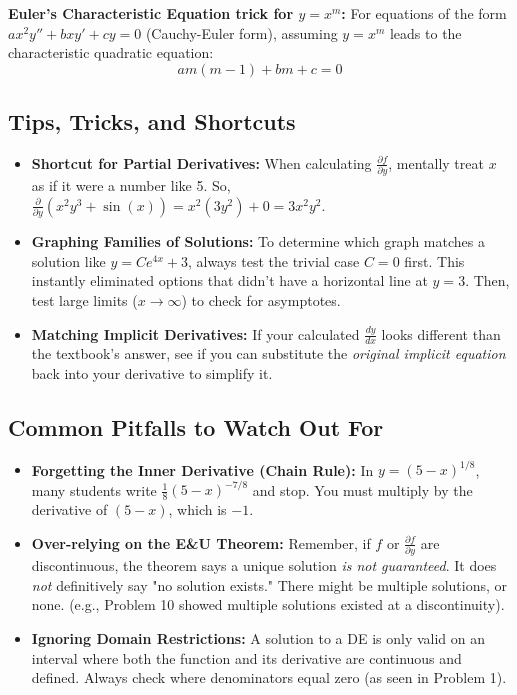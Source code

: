 \documentclass[12pt]{article}
\begin{document}
\textbf{Euler's Characteristic Equation trick for $y = x^m$:}
For equations of the form $ax^2y'' + bxy' + cy = 0$ (Cauchy-Euler form), assuming $y=x^m$ leads to the characteristic quadratic equation: 
\[ am(m-1) + bm + c = 0 \]

\subsection*{Tips, Tricks, and Shortcuts}
\begin{itemize}
    \item \textbf{Shortcut for Partial Derivatives:} When calculating $\frac{\partial f}{\partial y}$, mentally treat $x$ as if it were a number like 5. So, $\frac{\partial}{\partial y}(x^2 y^3 + \sin(x)) = x^2(3y^2) + 0 = 3x^2y^2$.
    \item \textbf{Graphing Families of Solutions:} To determine which graph matches a solution like $y = Ce^{4x} + 3$, always test the trivial case $C=0$ first. This instantly eliminated options that didn't have a horizontal line at $y=3$. Then, test large limits ($x \to \infty$) to check for asymptotes.
    \item \textbf{Matching Implicit Derivatives:} If your calculated $\frac{dy}{dx}$ looks different than the textbook's answer, see if you can substitute the \textit{original implicit equation} back into your derivative to simplify it.
\end{itemize}

\subsection*{Common Pitfalls to Watch Out For}
\begin{itemize}
    \item \textbf{Forgetting the Inner Derivative (Chain Rule):} In $y=(5-x)^{1/8}$, many students write $\frac{1}{8}(5-x)^{-7/8}$ and stop. You must multiply by the derivative of $(5-x)$, which is $-1$.
    \item \textbf{Over-relying on the E\&U Theorem:} Remember, if $f$ or $\frac{\partial f}{\partial y}$ are discontinuous, the theorem says a unique solution \textit{is not guaranteed}. It does \textit{not} definitively say "no solution exists." There might be multiple solutions, or none. (e.g., Problem 10 showed multiple solutions existed at a discontinuity).
    \item \textbf{Ignoring Domain Restrictions:} A solution to a DE is only valid on an interval where both the function and its derivative are continuous and defined. Always check where denominators equal zero (as seen in Problem 1).
\end{itemize}
\end{document}
